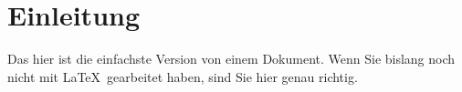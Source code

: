 \documentclass[12pt,a4paper]{scrartcl}
\begin{document}
%
\section{Einleitung}
Das hier ist die einfachste Version von einem Dokument. 
Wenn Sie bislang noch nicht mit \LaTeX\, gearbeitet haben, sind Sie hier genau richtig.
%
\end{document}
